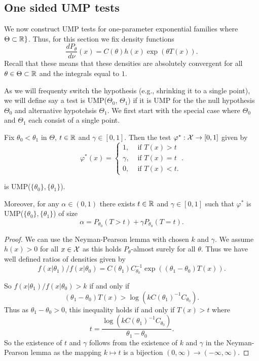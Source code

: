 \documentclass[twoside, a4paper, 10pt]{amsart}
\begin{document}
\subsection{One sided UMP tests}

We now construct UMP tests for one-parameter exponential families where $\Theta \subset \mathbb{R}\}$. Thus, for this section we fix density functions $$\frac{dP_{\theta}}{d\nu}(x) = C(\theta)h(x) \exp(\theta T(x)).$$ Recall that these means that these densities are absolutely convergent for all $\theta \in \Theta \subset \mathbb{R}$ and the integrals equal to $1$.

As we will frequenty switch the hypothesis (e.g., shrinking it to a single point), we will define say a test is UMP($\Theta_0$, $\Theta_1$) if it is UMP for the the null hypothesis $\Theta_0$ and alternative hypotehsis $\Theta_1$.
We first start with the special case where $\Theta_0$ and $\Theta_1$ each consist of a single point.

\begin{prop} Fix $\theta_0 < \theta_1$ in $\Theta$, $t \in \mathbb{R}$ and $\gamma \in [0,1]$. Then the test $\varphi^*:\mathcal{X} \to [0,1]$ given by
$$\varphi^*(x) = \begin{cases}
1, & \text{ if } T(x) > t \\
\gamma, & \text{ if } T(x) = t \\  
0, & \text{ if } T(x) < t.\end{cases}.$$

is UMP($\{\theta_0\}, \{\theta_1\}$).

Moreover, for any $\alpha \in (0,1)$ there exists $t \in \mathbb{R}$ and $\gamma \in [0,1]$ such that $\varphi^*$ is UMP($\{\theta_0\}, \{\theta_1\}$) of size $$\alpha = P_{\theta_0}(T > t) + \gamma P_{\theta_0}(T = t). $$

\end{prop}

\begin{proof} We can use the Neyman-Pearson lemma with chosen $k$ and $\gamma$. We assume $h(x)>0$ for all $x \in \mathcal{X}$ as this holds $P_{\theta}$-almost surely for all $\theta$. Thus we have well defined ratios of densities given by $$f(x|\theta_1)/f(x|\theta_0) = C(\theta_1)C_{\theta_0}^{-1} \exp((\theta_1 - \theta_0)T(x)). $$

So $f(x|\theta_1)/f(x|\theta_0)  > k$ if and only if $$(\theta_1 - \theta_0) T(x) > \log(k C(\theta_1)^{-1}C_{\theta_0}).$$ Thus as $\theta_1 - \theta_0 > 0$, this inequality holds if and only if $T(x) > t$ where $$t  =\frac{\log(k C(\theta_1)^{-1}C_{\theta_0})}{\theta_1 - \theta_0 }.$$
So the existence of $t$ and $\gamma$ follows from the existence of $k$ and $\gamma$ in the Neyman-Pearson lemma as the mapping $k \mapsto t$ is a bijection $(0,\infty) \to (-\infty, \infty)$.  \end{proof}
\end{document}
